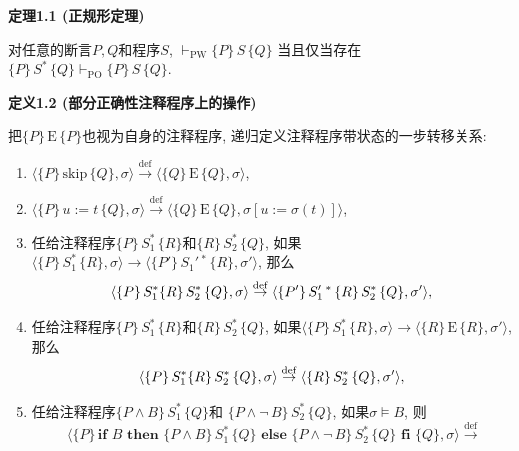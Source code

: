 \documentclass[UTF8]{ctexart}
\begin{document}
\vspace{15pt}

\hypertarget{sec:定理1.1}{}
\noindent\textbf{定理1.1 (正规形定理)}

对任意的断言$P,Q$和程序$S$, $\vdash_{\mathrm{PW}}\{P\}\,S\,\{Q\}$
当且仅当存在$\{P\}\,S^*\,\{Q\}\vdash_{\mathrm{PO}}\{P\}\,S\,\{Q\}$.

\vspace{15pt}

\hypertarget{sec:定义1.2}{}
\noindent\textbf{定义1.2 (部分正确性注释程序上的操作)}

把$\{P\}\,\mathrm{E}\,\{P\}$也视为自身的注释程序,
递归定义注释程序带状态的一步转移关系:
\begin{enumerate}
    \item $\langle\{P\}\,\mathrm{skip}\,\{Q\},\sigma\rangle
    \overset{\mathrm{def}}{\to}
    \langle\{Q\}\,\mathrm{E}\,\{Q\},\sigma\rangle$,
    \item $\langle\{P\}\,u:=t\,\{Q\},\sigma\rangle\overset{\mathrm{def}}{\to}
    \langle\{Q\}\,\mathrm{E}\,\{Q\},\sigma[u:=\sigma(t)]\rangle$,
    \vspace{3pt}
    \item 任给注释程序$\{P\}\,S_1^*\,\{R\}$和$\{R\}\,S_2^*\,\{Q\}$,
    如果$\langle\{P\}\,S_1^*\,\{R\},\sigma\rangle\to
    \langle\{P'\}\,S_1'\,^*\,\{R\},\sigma'\rangle$, 那么
    \vspace{1pt}
    \[
        \langle\{P\}\,S_1^*\{R\}\,S_2^*\,\{Q\},\sigma\rangle
        \overset{\mathrm{def}}{\to}
        \langle\{P'\}\,S_1'\,^*\,\{R\}\,S_2^*\,\{Q\},\sigma'\rangle,\\[1pt]
    \]
    \item 任给注释程序$\{P\}\,S_1^*\,\{R\}$和$\{R\}\,S_2^*\,\{Q\}$,
    如果$\langle\{P\}\,S_1^*\,\{R\},\sigma\rangle\to
    \langle\{R\}\,\mathrm{E}\,\{R\},\sigma'\rangle$, 那么
    \vspace{1pt}
    \[
        \langle\{P\}\,S_1^*\{R\}\,S_2^*\,\{Q\},\sigma\rangle
        \overset{\mathrm{def}}{\to}
        \langle\{R\}\,S_2^*\,\{Q\},\sigma'\rangle,\\[1pt]
    \]
    \item 任给注释程序$\{P\land B\}\,S_1^*\,\{Q\}$和
    $\{P\land\neg\,B\}\,S_2^*\,\{Q\}$, 如果$\sigma\models B$, 则
    \vspace{1pt}
    \[
        \,\,\langle\{P\}\,\mathbf{if}\,\,B\,\,\mathbf{then}\,\,
        \{P\land B\}\,S_1^*\,\{Q\}\,\,\mathbf{else}\,\,\{P\land\neg\,B\}\,S_2^*
        \,\{Q\}\,\,\mathbf{fi}\,\,\{Q\},\sigma\rangle\overset{\mathrm{def}}{\to}
\]
\end{enumerate}
\end{document}
